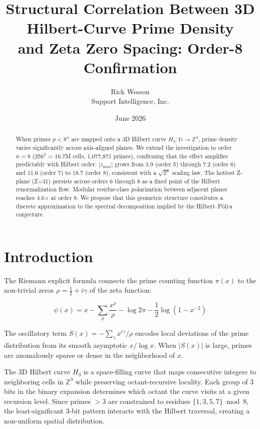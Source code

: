 \documentclass[11pt,a4paper]{article}
\title{Structural Correlation Between 3D Hilbert-Curve Prime Density\\
and Zeta Zero Spacing: Order-8 Confirmation}
\author{Rick Wesson\\
Support Intelligence, Inc.}
\date{June 2026}
\begin{document}
\maketitle

\begin{abstract}
When primes $p < 8^n$ are mapped onto a 3D Hilbert curve $H_3: \mathbb{N}
\to \mathbb{Z}^3$, prime density varies significantly across axis-aligned
planes. We extend the investigation to order $n=8$ (256$^3$ = 16.7M cells,
1,077,871 primes), confirming that the effect amplifies predictably with
Hilbert order: $|z_{\text{max}}|$ grows from 3.9 (order 5) through 7.2
(order 6) and 11.6 (order 7) to 18.7 (order 8), consistent with a
$\sqrt{2^n}$ scaling law. The hottest Z-plane (Z=31) persists across
orders 6 through 8 as a fixed point of the Hilbert renormalization flow.
Modular residue-class polarization between adjacent planes reaches 4.6$\times$
at order 8. We propose that this geometric structure constitutes a
discrete approximation to the spectral decomposition implied by the
Hilbert--P\'{o}lya conjecture.
\end{abstract}

\section{Introduction}

The Riemann explicit formula connects the prime counting function $\pi(x)$
to the non-trivial zeros $\rho = \frac{1}{2} + i\gamma$ of the zeta
function:

\begin{equation}
\psi(x) = x - \sum_{\rho} \frac{x^{\rho}}{\rho} - \log 2\pi
- \frac{1}{2}\log(1 - x^{-2})
\label{eq:explicit}
\end{equation}

The oscillatory term $S(x) = -\sum_{\gamma} x^{i\gamma}/\rho$ encodes
local deviations of the prime distribution from its smooth asymptotic
$x/\log x$. When $|S(x)|$ is large, primes are anomalously sparse or dense
in the neighborhood of $x$.

The 3D Hilbert curve $H_3$ is a space-filling curve that maps consecutive
integers to neighboring cells in $\mathbb{Z}^3$ while preserving
octant-recursive locality. Each group of 3 bits in the binary expansion
determines which octant the curve visits at a given recursion level.
Since primes $>3$ are constrained to residues $\{1,3,5,7\} \bmod 8$, the
least-significant 3-bit pattern interacts with the Hilbert traversal,
creating a non-uniform spatial distribution.
\end{document}
